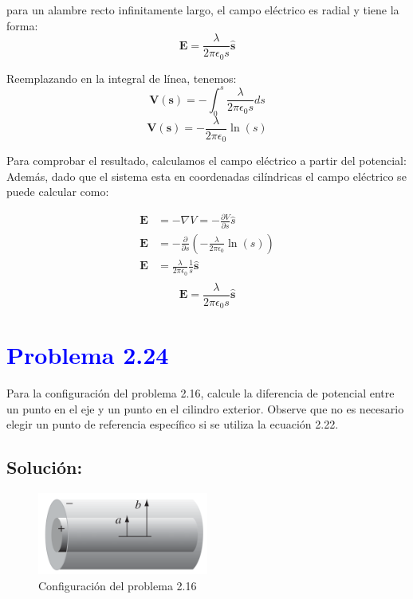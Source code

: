 \documentclass[12pt]{article}
\newcommand{\question}[1]{\textcolor{blue}{\textbf{#1}}}
\begin{document}
para un alambre recto infinitamente largo, el campo eléctrico es radial y tiene la forma:
\[
\mathbf{E} = \frac{\lambda}{2\pi \epsilon_0 s} \hat{\mathbf{s}}
\]

Reemplazando en la integral de línea, tenemos:
\[
    \mathbf{V(s)} = -\int_{0}^{s} \frac{\lambda}{2\pi \epsilon_0 s} ds 
\]
\[
\boxed{\mathbf{V(s)} =  -\frac{\lambda}{2\pi \epsilon_0} \ln(s) }
\]

Para comprobar el resultado, calculamos el campo eléctrico a partir del potencial:
Además, dado que el sistema esta en coordenadas cilíndricas el campo eléctrico se puede calcular como:

\begin{align*}
    \mathbf{E}  &= -\nabla V = -\frac{\partial V}{\partial s} \hat{s} \\
    \mathbf{E} &= -\frac{\partial}{\partial s} \left(-\frac{\lambda}{2\pi \epsilon_0} \ln(s) \right) \\
    \mathbf{E} &= \frac{\lambda}{2\pi \epsilon_0} \frac{1}{s} \hat{\mathbf{s}} \\
\end{align*}
\[
\boxed{\mathbf{E} = \frac{\lambda}{2\pi \epsilon_0 s} \hat{\mathbf{s}}}
\]

\section*{\question{ Problema 2.24}}Para la configuración del problema 2.16, calcule la diferencia de potencial entre un punto en el eje y un punto en el cilindro exterior. Observe que no es necesario elegir un punto de referencia específico si se utiliza la ecuación 2.22.
\subsection*{Solución:}

\begin{figure}[H]
    \centering
    \includegraphics[width=0.5\textwidth]{imagenes/problema_24.png}
    \caption*{\label{fig:problema_24}Configuración del problema 2.16}
\end{figure}
\end{document}
